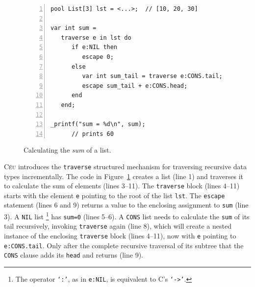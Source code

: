 \documentclass{sig-alternate}
\newcommand{\CEU}{\textsc{C\'{e}u}\xspace}
\newcommand{\code}[1] {{\small{\texttt{#1}}}}
\begin{document}
\begin{figure}[t]
\begin{lstlisting}[numbers=left,xleftmargin=3em]
pool List[3] lst = <...>;  // [10, 20, 30]

var int sum =
   traverse e in lst do
      if e:NIL then
         escape 0;
      else
         var int sum_tail = traverse e:CONS.tail;
         escape sum_tail + e:CONS.head;
      end
   end;

_printf("sum = %d\n", sum);
      // prints 60
\end{lstlisting}
\caption{
Calculating the \emph{sum} of a list.
\label{lst.list.sum}
}
\end{figure}

\CEU introduces the \code{traverse} structured mechanism for traversing 
recursive data types incrementally.
%
The code in Figure~\ref{lst.list.sum} creates a list (line 1) and traverses it 
to calculate the sum of elements (lines 3--11).
The \code{traverse} block (lines 4--11) starts with the element \code{e} 
pointing to the root of the list \code{lst}.
The \code{escape} statement (lines 6 and 9) returns a value to the enclosing 
assignment to \code{sum} (line 3).
A \code{NIL} list%
\footnote{
The operator \code{`:'}, as in \code{e:NIL}, is equivalent to C's \code{`->'}.
}
has \code{sum=0} (lines 5--6).
A \code{CONS} list needs to calculate the \code{sum} of its tail recursively, 
invoking \code{traverse} again (line 8), which will create a nested instance of 
the enclosing \code{traverse} block (lines 4--11), now with \code{e} pointing 
to \code{e:CONS.tail}.
Only after the complete recursive traversal of its subtree that the \code{CONS} 
clause adds its \code{head} and returns (line 9).
\end{document}
